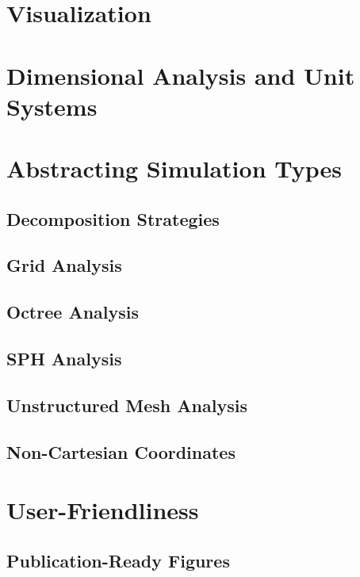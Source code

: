 \documentclass{emulateapj}
\begin{document}
\section{Visualization}

\section{Dimensional Analysis and Unit Systems}



\section{Abstracting Simulation Types}

\subsection{Decomposition Strategies}

\subsection{Grid Analysis}

\subsection{Octree Analysis}

\subsection{SPH Analysis}

\subsection{Unstructured Mesh Analysis}

\subsection{Non-Cartesian Coordinates}

\section{User-Friendliness}

\subsection{Publication-Ready Figures}
\end{document}
